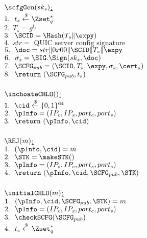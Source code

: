 

\noindent
\underline{$\scfgGen(sk_s)$:} \\
 $1.\ \ t_s \xleftarrow{\$} \Zset_{q}^{\ast}$ \\
 $2.\ \ T_s = g^{t_s}$ \\
 $3.\ \ \SCID = \Hash(T_s \| \expy)$ \\
 $4.\ \ str = \text{ QUIC server config signature }$ \\
 $5.\ \ \doc = str \| 0x00 \| \SCID \| T_s \| \expy$ \\
 $6.\ \ \sigma_s = \SIG.\Sign(sk_s, \doc)$ \\
 $7.\ \ \SCFG_{pub} = (\SCID, T_s, \expy, \sigma_s, \cert_s)$ \\
 $8.\ \ \return\ (\SCFG_{pub}, t_s)$ \\
\\
\underline{$\inchoateCHLO()$:} \\
 $1.\ \ \cid \xleftarrow{\$} \{0,1\}^{64} $ \\
 $2.\ \ \pInfo = (IP_c, IP_s, port_c, port_s)$ \\
 $3.\ \ \return\ (\pInfo, \cid)$ \\
\\
\underline{$\REJ(m)$:} \\
 $1.\ \ (\pInfo, \cid) = m$ \\
 $2.\ \ \STK = \makeSTK()$ \\
 $3.\ \ \pInfo = (IP_s, IP_c, port_s, port_c)$ \\
 $4.\ \ \return\ (\pInfo, \cid, \SCFG_{pub}, \STK)$ \\
\\
\underline{$\initialCHLO(m)$:} \\
 $1.\ \ (\pInfo, \cid, \SCFG_{pub}, \STK) = m$ \\
 $2.\ \ \pInfo = (IP_c, IP_s, port_c, port_s)$ \\
 $3.\ \ \checkSCFG(\SCFG_{pub})$ \\
 $4.\ \ t_c \xleftarrow{\$} \Zset_{q}^{\ast}$ \\
